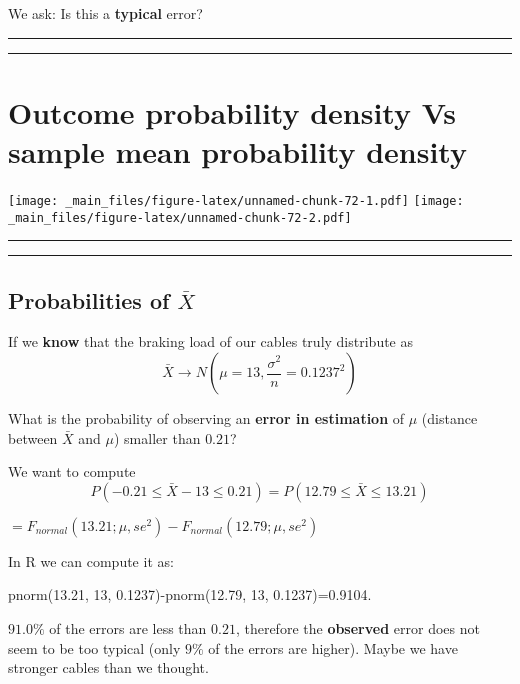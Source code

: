 \documentclass[
]{book}
\begin{document}
We ask: Is this a \textbf{typical} error?

\begin{center}\rule{0.5\linewidth}{0.5pt}\end{center}

\begin{center}\rule{0.5\linewidth}{0.5pt}\end{center}

\hypertarget{outcome-probability-density-vs-sample-mean-probability-density}{%
\section{Outcome probability density Vs sample mean probability density}\label{outcome-probability-density-vs-sample-mean-probability-density}}

\texttt{[image: \_main\_files/figure-latex/unnamed-chunk-72-1.pdf]} \texttt{[image: \_main\_files/figure-latex/unnamed-chunk-72-2.pdf]}

\begin{center}\rule{0.5\linewidth}{0.5pt}\end{center}

\begin{center}\rule{0.5\linewidth}{0.5pt}\end{center}

\hypertarget{probabilities-of-barx}{%
\subsection{\texorpdfstring{Probabilities of \(\bar{X}\)}{Probabilities of \textbackslash bar\{X\}}}\label{probabilities-of-barx}}

If we \textbf{know} that the braking load of our cables truly distribute as \[\bar{X} \rightarrow N(\mu=13, \frac{\sigma^2}{n}=0.1237^2)\]

What is the probability of observing an \textbf{error in estimation} of \(\mu\) (distance between \(\bar{X}\) and \(\mu\)) smaller than \(0.21\)?

We want to compute \[P(-0.21 \leq \bar{X} - 13\leq 0.21)=P(12.79 \leq \bar{X} \leq 13.21)\]

\(=F_{normal}(13.21; \mu, se^2)-F_{normal}(12.79; \mu, se^2)\)

In R we can compute it as:

pnorm(13.21, 13, 0.1237)-pnorm(12.79, 13, 0.1237)=0.9104.

\(91.0\%\) of the errors are less than \(0.21\), therefore the \textbf{observed} error does not seem to be too typical (only \(9\%\) of the errors are higher). Maybe we have stronger cables than we thought.
\end{document}

